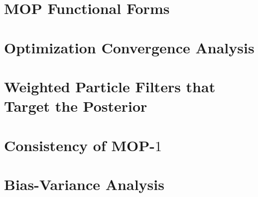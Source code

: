 \documentclass[11pt]{article}
\newcommand\arxiv[2]{#1} %
\begin{document}
\arxiv{}{
\showmatmethods{} %
\acknow{Please include your acknowledgments here, set in a single paragraph. Please do not include any acknowledgments in the Supporting Information, or anywhere else in the manuscript.}
\showacknow{} %
}


% 


\arxiv{
\appendix

\section{MOP Functional Forms}



\section{Optimization Convergence Analysis}



\section{Weighted Particle Filters that Target the Posterior}



\section{Consistency of MOP-$1$}


\section{Bias-Variance Analysis}

}{
}
\end{document}

